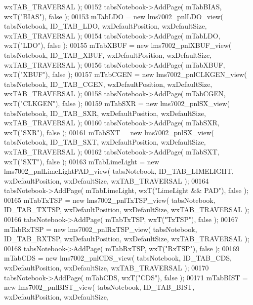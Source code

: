 \begin{DoxyCode}
      wxTAB\_TRAVERSAL );
00152     tabsNotebook->AddPage( mTabBIAS, wxT(\textcolor{stringliteral}{"BIAS"}), \textcolor{keyword}{false} );
00153     mTabLDO = \textcolor{keyword}{new} lms7002_pnlLDO_view( tabsNotebook, ID_TAB_LDO, wxDefaultPosition, wxDefaultSize, 
      wxTAB\_TRAVERSAL );
00154     tabsNotebook->AddPage( mTabLDO, wxT(\textcolor{stringliteral}{"LDO"}), \textcolor{keyword}{false} );
00155     mTabXBUF = \textcolor{keyword}{new} lms7002_pnlXBUF_view( tabsNotebook, ID_TAB_XBUF, wxDefaultPosition, wxDefaultSize, 
      wxTAB\_TRAVERSAL );
00156     tabsNotebook->AddPage( mTabXBUF, wxT(\textcolor{stringliteral}{"XBUF"}), \textcolor{keyword}{false} );
00157     mTabCGEN = \textcolor{keyword}{new} lms7002_pnlCLKGEN_view( tabsNotebook, ID_TAB_CGEN, wxDefaultPosition, wxDefaultSize, 
      wxTAB\_TRAVERSAL );
00158     tabsNotebook->AddPage( mTabCGEN, wxT(\textcolor{stringliteral}{"CLKGEN"}), \textcolor{keyword}{false} );
00159     mTabSXR = \textcolor{keyword}{new} lms7002_pnlSX_view( tabsNotebook, ID_TAB_SXR, wxDefaultPosition, wxDefaultSize, 
      wxTAB\_TRAVERSAL );
00160     tabsNotebook->AddPage( mTabSXR, wxT(\textcolor{stringliteral}{"SXR"}), \textcolor{keyword}{false} );
00161     mTabSXT = \textcolor{keyword}{new} lms7002_pnlSX_view( tabsNotebook, ID_TAB_SXT, wxDefaultPosition, wxDefaultSize, 
      wxTAB\_TRAVERSAL );
00162     tabsNotebook->AddPage( mTabSXT, wxT(\textcolor{stringliteral}{"SXT"}), \textcolor{keyword}{false} );
00163     mTabLimeLight = \textcolor{keyword}{new} lms7002_pnlLimeLightPAD_view( tabsNotebook, 
      ID_TAB_LIMELIGHT, wxDefaultPosition, wxDefaultSize, wxTAB\_TRAVERSAL );
00164     tabsNotebook->AddPage( mTabLimeLight, wxT(\textcolor{stringliteral}{"LimeLight && PAD"}), \textcolor{keyword}{false} );
00165     mTabTxTSP = \textcolor{keyword}{new} lms7002_pnlTxTSP_view( tabsNotebook, ID_TAB_TXTSP, wxDefaultPosition, wxDefaultSize, 
      wxTAB\_TRAVERSAL );
00166     tabsNotebook->AddPage( mTabTxTSP, wxT(\textcolor{stringliteral}{"TxTSP"}), \textcolor{keyword}{false} );
00167     mTabRxTSP = \textcolor{keyword}{new} lms7002_pnlRxTSP_view( tabsNotebook, ID_TAB_RXTSP, wxDefaultPosition, wxDefaultSize, 
      wxTAB\_TRAVERSAL );
00168     tabsNotebook->AddPage( mTabRxTSP, wxT(\textcolor{stringliteral}{"RxTSP"}), \textcolor{keyword}{false} );
00169     mTabCDS = \textcolor{keyword}{new} lms7002_pnlCDS_view( tabsNotebook, ID_TAB_CDS, wxDefaultPosition, wxDefaultSize, 
      wxTAB\_TRAVERSAL );
00170     tabsNotebook->AddPage( mTabCDS, wxT(\textcolor{stringliteral}{"CDS"}), \textcolor{keyword}{false} );
00171     mTabBIST = \textcolor{keyword}{new} lms7002_pnlBIST_view( tabsNotebook, ID_TAB_BIST, wxDefaultPosition, wxDefaultSize, 

\end{DoxyCode}
